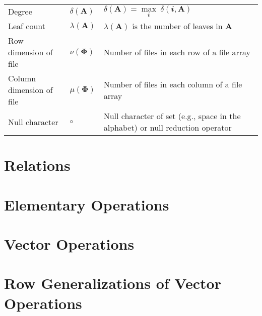 \begin{tabularx}{\textwidth}{ l l X }
	Degree                            & \( δ(\mathbf{A}) \)               & \( δ(\mathbf{A}) = \underset{\mathbfit{i}}{\max}\ δ(\mathbfit{i},\mathbf{A}) \)                                                                                                                      \\
	Leaf count                        & \( λ(\mathbf{A}) \)               & \( λ(\mathbf{A}) \) is the number of leaves in \( \mathbf{A} \)                                                                                                                                      \\
	Row dimension of file             & \( ν(\mathbf{Φ}) \)               & Number of files in each row of a file array                                                                                                                                                          \\
	Column dimension of file          & \( μ(\mathbf{Φ}) \)               & Number of files in each column of a file array                                                                                                                                                       \\
	Null character                    & \( ∘ \)                           & Null character of set (e.g., space in the alphabet) or null reduction operator                                                                                                                       \\
\end{tabularx}

\section{Relations}


\section{Elementary Operations}


\section{Vector Operations}


\section{Row Generalizations of Vector Operations}


